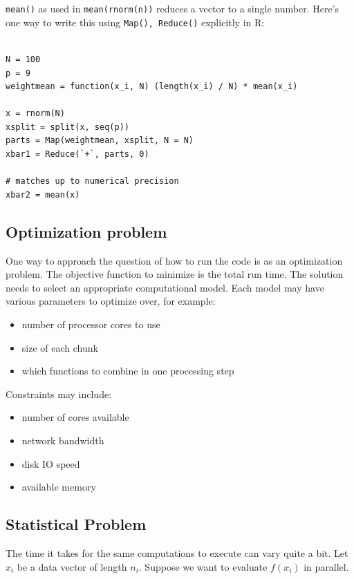 \documentclass[12pt]{article}
\begin{document}
\texttt{mean()} as used in \texttt{mean(rnorm(n))} reduces a vector to a
single number. Here's one way to write this using \texttt{Map(), Reduce()}
explicitly in R:

\begin{verbatim}

N = 100
p = 9
weightmean = function(x_i, N) (length(x_i) / N) * mean(x_i)

x = rnorm(N)
xsplit = split(x, seq(p))
parts = Map(weightmean, xsplit, N = N)
xbar1 = Reduce(`+`, parts, 0)

# matches up to numerical precision
xbar2 = mean(x)

\end{verbatim}

\subsection{Optimization problem}

One way to approach the question of how to run the code is as an
optimization problem. The objective function to minimize is the total run
time. The solution needs to select an appropriate computational model. Each
model may have various parameters to optimize over, for example:

\begin{itemize}
    \item number of processor cores to use
    \item size of each chunk
    \item which functions to combine in one processing step
\end{itemize}

Constraints may include:

\begin{itemize}
    \item number of cores available
    \item network bandwidth
    \item disk IO speed
    \item available memory
\end{itemize}

\subsection{Statistical Problem}

The time it takes for the same computations to execute can vary quite a
bit. Let $x_i$ be a data vector of length $n_i$. Suppose we want to evaluate
$f(x_i)$ in parallel.
\end{document}
